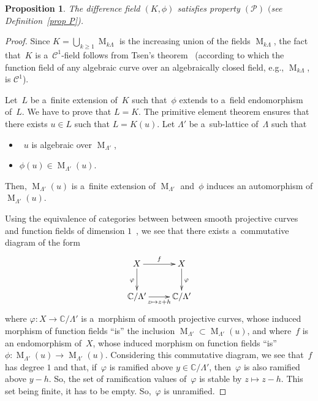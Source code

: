 \documentclass[10pt,a4paper]{amsart}
\numberwithin{equation}{section}
\newtheorem{Proposition}[Theorem]{Proposition}
{ \theoremstyle{definition}
\newtheorem{Definition}[Theorem]{Definition}
\newtheorem{Remark}[Theorem]{Remark} }
\begin{document}
\begin{Proposition}
The difference field $(K,\phi)$ satisfies property $(\mathcal{P})$ $($see Definition~{\rm \ref{prop P})}.
\end{Proposition}

\begin{proof}
Since $K = \bigcup_{k \geq 1} \operatorname{M}_{k \Lambda}$ is the increasing union of the f\/ields
$\operatorname{M}_{k \Lambda}$, the fact that~$K$ is a~$\mathcal{C}^{1}$-f\/ield follows from Tsen's
theorem~\cite{LangQAC} (according to which the function f\/ield of any algebraic curve over an algebraically closed f\/ield,
e.g.,
$\operatorname{M}_{k \Lambda}$, is $\mathcal{C}^{1}$).

Let~$L$ be a~f\/inite extension of~$K$ such that~$\phi$ extends to a~f\/ield endomorphism of~$L$.
We have to prove that $L=K$.
The primitive element theorem ensures that there exists $u \in L$ such that $L=K(u)$.
Let $\Lambda'$ be a~sub-lattice of~$\Lambda$ such that
\begin{itemize}
\itemsep=0pt
\item~$u$ is algebraic over $\operatorname{M}_{\Lambda'}$,
\item $\phi(u) \in \operatorname{M}_{\Lambda'}(u)$.
\end{itemize}
Then, $\operatorname{M}_{\Lambda'}(u)$ is a~f\/inite extension of $\operatorname{M}_{\Lambda'}$ and~$\phi$ induces an
automorphism of $\operatorname{M}_{\Lambda'}(u)$.

Using the equivalence of categories between between smooth projective curves and function f\/ields of dimension
$1$~\cite[Corollary 6.12]{HartshorneAG}, we see that there exists a~commutative diagram of the form
\begin{gather*}
\xymatrix{X \ar[r]^{f} \ar[d]_{\varphi} &  X \ar[d]^{\varphi}
\\
\mathbb C/\Lambda' \ar[r]_{z \mapsto z+h}  & \mathbb C/\Lambda'}
\end{gather*}
where $\varphi: X \rightarrow \mathbb C/\Lambda'$ is a~morphism of smooth projective curves, whose induced morphism of
function f\/ields ``is'' the inclusion $\operatorname{M}_{\Lambda'} \subset \operatorname{M}_{\Lambda'}(u)$, and where~$f$
is an endomorphism of~$X$, whose induced morphism on function f\/ields ``is'' $\phi: \operatorname{M}_{\Lambda'}(u)
\rightarrow \operatorname{M}_{\Lambda'}(u)$.
Considering this commutative diagram, we see that~$f$ has degree $1$ and that, if~$\varphi$ is ramif\/ied above $y \in
\mathbb C/\Lambda'$, then~$\varphi$ is also ramif\/ied above $y-h$.
So, the set of ramif\/ication values of~$\varphi$ is stable by $z \mapsto z-h$.
This set being f\/inite, it has to be empty.
So,~$\varphi$ is unramif\/ied.


\end{proof}
\end{document}
